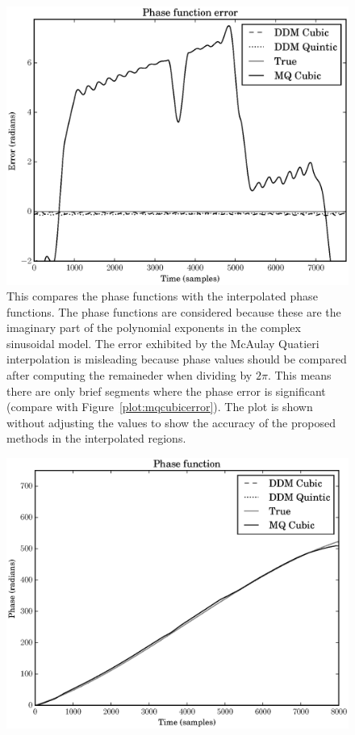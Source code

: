 \begin{figure}[!t]
    \includegraphics[width=\textwidth]{plots/mq_mod_err_comp_phase_err.eps}
    \caption{This compares the phase functions with the interpolated phase
    functions. The phase functions are considered because these are the
    imaginary part of the polynomial exponents in the complex sinusoidal model.
    The error exhibited by the McAulay \textendash Quatieri interpolation is
    misleading because phase values should be compared after computing the
    remaineder when dividing by $2\pi$. This means there are only brief segments
    where the phase error is significant (compare with
    Figure~\ref{plot:mqcubicerror}). The plot is shown without adjusting the
    values to show the accuracy of the proposed methods in the interpolated
    regions.
    \label{plot:mqmoderrcompphaseerr}}
\end{figure}

\begin{figure}[!t]
    \includegraphics[width=\textwidth]{plots/mq_mod_err_comp_phase_func.eps}
    \caption{\label{plot:mqmoderrcompphasefunc}}
\end{figure}

